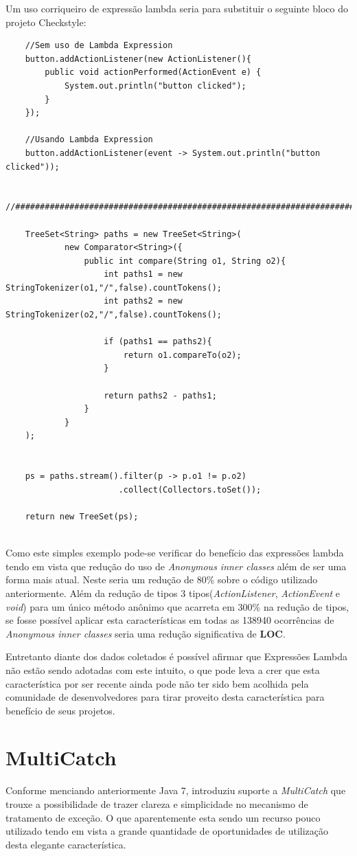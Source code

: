 Um uso corriqueiro de expressão lambda seria para substituir o seguinte bloco do projeto Checkstyle:
\begin{lstlisting}
	//Sem uso de Lambda Expression
	button.addActionListener(new ActionListener(){
		public void actionPerformed(ActionEvent e) {
			System.out.println("button clicked");
		}
	});

	//Usando Lambda Expression
	button.addActionListener(event -> System.out.println("button clicked"));
	
	//###########################################################################
	
	TreeSet<String> paths = new TreeSet<String>(
			new Comparator<String>({
				public int compare(String o1, String o2){
					int paths1 = new StringTokenizer(o1,"/",false).countTokens();
					int paths2 = new StringTokenizer(o2,"/",false).countTokens();
				
					if (paths1 == paths2){
						return o1.compareTo(o2);
					}
				
					return paths2 - paths1;
				}
			}
	);
	
	
	ps = paths.stream().filter(p -> p.o1 != p.o2)
					   .collect(Collectors.toSet());
	
	return new TreeSet(ps);
	
\end{lstlisting}

Como este simples exemplo pode-se verificar do benefício das expressões lambda tendo em vista que  redução do uso de \textit{Anonymous inner classes} além de ser uma forma mais atual. Neste seria um redução de 80\% sobre o código utilizado anteriormente. Além da redução de tipos 3 tipos(\textit{ActionListener}, \textit{ActionEvent} e \textit{void}) para um único método anônimo que acarreta em 300\% na redução de tipos,  se fosse possível aplicar esta características em todas as 138940 ocorrências de \textit{Anonymous inner classes} seria uma redução significativa de \textbf{LOC}.

Entretanto diante dos dados coletados é possível afirmar que Expressões Lambda não estão sendo adotadas com este intuito, o que pode leva a crer que esta característica por ser recente ainda pode não ter sido bem acolhida pela comunidade de desenvolvedores para tirar proveito desta  característica para benefício de seus projetos.\\

\section{MultiCatch}
Conforme menciando anteriormente Java 7, introduziu suporte a \textit{MultiCatch} que trouxe a possibilidade de trazer clareza e simplicidade no mecanismo de tratamento de exceção. O que aparentemente esta sendo um recurso pouco utilizado tendo em vista a grande quantidade de oportunidades de utilização desta elegante característica.\\


